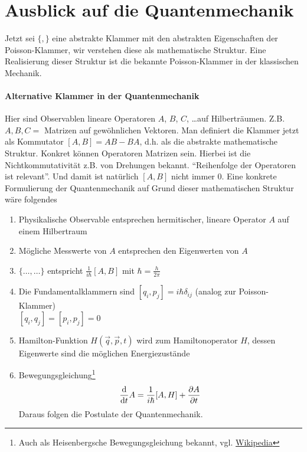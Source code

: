 \newcommand{\fihbar}{\frac{1}{i \hbar}}

\section{Ausblick auf die Quantenmechanik}
Jetzt sei $\{,\}$ eine abstrakte Klammer mit den abstrakten Eigenschaften der Poisson-Klammer, wir verstehen diese als mathematische Struktur.
Eine Realisierung dieser Struktur ist die bekannte Poisson-Klammer in der klassischen Mechanik.

\paragraph{Alternative Klammer in der Quantenmechanik}
Hier sind Observablen lineare Operatoren $A$, $B$, $C$, \dots auf Hilberträumen. Z.B. $A,B,C = $ Matrizen auf gewöhnlichen Vektoren. Man definiert die Klammer jetzt als Kommutator $[A,B] = AB - BA$, d.h.
als die abstrakte mathematische Struktur. Konkret können Operatoren Matrizen sein. Hierbei ist die Nichtkommutativität z.B. von Drehungen bekannt. "`Reihenfolge der Operatoren ist relevant"'. Und damit ist natürlich $[A, B]$ nicht immer $0$.
Eine konkrete Formulierung der Quantenmechanik auf Grund dieser mathematischen Struktur wäre folgendes
\begin{enumerate}
	\item Physikalische Observable entsprechen hermitischer, lineare Operator $A$ auf einem Hilbertraum
	\item Mögliche Messwerte von $A$ entsprechen den Eigenwerten von $A$
	\item $\{\dots, \dots\}$ entspricht $\fihbar [A, B]$ mit $\hbar = \frac{h}{2 \pi}$
	\item Die Fundamentalklammern sind
	$[q_i, p_j] = i \hbar \delta_{ij}$ (analog zur Poisson-Klammer)\\
	$[q_i, q_j] = [p_i, p_j] = 0$
	\item Hamilton-Funktion $H(\vec{q}, \vec{p}, t)$ wird zum Hamiltonoperator $H$, dessen Eigenwerte sind die möglichen Energiezustände
	\item Bewegungsgleichung\footnote{Auch als Heisenbergsche Bewegungsgleichung bekannt, vgl. \href{https://de.wikipedia.org/wiki/Heisenbergsche_Bewegungsgleichung}{Wikipedia}}
	$$\dd t A = \fihbar [A, H] + \ffpartial{A}{t}$$
	Daraus folgen die Postulate der Quantenmechanik.
\end{enumerate}

